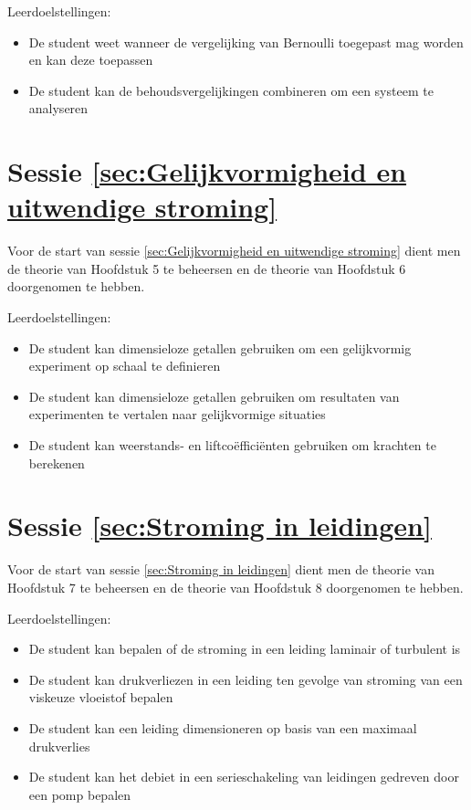 Leerdoelstellingen:
\begin{itemize}
	\item De student weet wanneer de vergelijking van Bernoulli toegepast mag worden en kan deze toepassen
	\item De student kan de behoudsvergelijkingen combineren om een systeem te analyseren
\end{itemize}

	\section*{Sessie \ref{sec:Gelijkvormigheid en uitwendige stroming}}
Voor de start van sessie \ref{sec:Gelijkvormigheid en uitwendige stroming} dient men de theorie van Hoofdstuk 5 te beheersen en de theorie van Hoofdstuk 6 doorgenomen te hebben.

Leerdoelstellingen:
\begin{itemize}
	\item De student kan dimensieloze getallen gebruiken om een gelijkvormig experiment op schaal te definieren
	\item De student kan dimensieloze getallen gebruiken om resultaten van experimenten te vertalen naar gelijkvormige situaties
	\item De student kan weerstands- en liftcoëfficiënten gebruiken om krachten te berekenen
\end{itemize}

	\section*{Sessie \ref{sec:Stroming in leidingen}}
Voor de start van sessie \ref{sec:Stroming in leidingen} dient men de theorie van Hoofdstuk 7 te beheersen en de theorie van Hoofdstuk 8 doorgenomen te hebben.

Leerdoelstellingen:
\begin{itemize}
	\item De student kan bepalen of de stroming in een leiding laminair of turbulent is
	\item De student kan drukverliezen in een leiding ten gevolge van stroming van een viskeuze vloeistof bepalen
	\item De student kan een leiding dimensioneren op basis van een maximaal drukverlies
	\item De student kan het debiet in een serieschakeling van leidingen gedreven door een pomp bepalen
\end{itemize}

